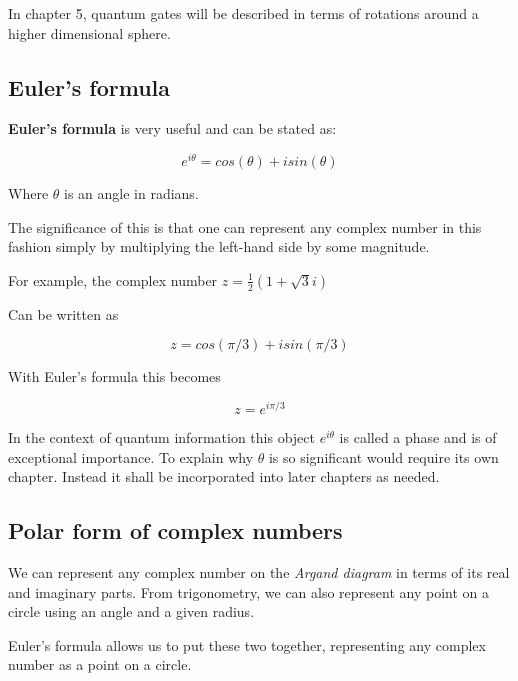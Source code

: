 \documentclass{book}
\begin{document}
In chapter 5, quantum gates will be described in terms of rotations around a higher dimensional sphere. 

\subsection{ Euler's formula}

\textbf{Euler's formula} is very useful and can be stated as:

$$ e^{i \theta} = cos(\theta) + i sin(\theta) $$

Where $\theta$ is an angle in radians. 

The significance of this is that one can represent any complex number in this fashion simply by multiplying the left-hand side by some magnitude. 

For example, the complex number $ z = \frac{1}{2}( 1 + \sqrt{3}i)$ 

Can be written as 

$$ z = cos(\pi/3) + i sin(\pi/3) $$

With Euler's formula this becomes 

$$ z = e^{i \pi/3} $$

In the context of quantum information this object $ e^{i\theta}$ is called a phase and is of exceptional importance. To explain why $\theta$ is so significant would require its own chapter. Instead it shall be incorporated into later chapters as needed.


\subsection{ Polar form of complex numbers}

We can represent any complex number on the \textit{Argand diagram} in terms of its real and imaginary parts. From trigonometry, we can also represent any point on a circle using an angle and a given radius. 

Euler's formula allows us to put these two together, representing any complex number as a point on a circle. 
\end{document}
